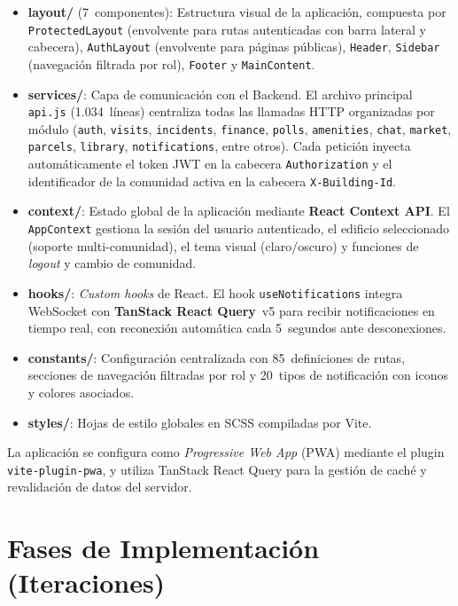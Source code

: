\begin{itemize}
    \item \textbf{layout/} (7~componentes): Estructura visual de la aplicación, compuesta por \texttt{ProtectedLayout} (envolvente para rutas autenticadas con barra lateral y cabecera), \texttt{AuthLayout} (envolvente para páginas públicas), \texttt{Header}, \texttt{Sidebar} (navegación filtrada por rol), \texttt{Footer} y \texttt{MainContent}.

    \item \textbf{services/}: Capa de comunicación con el Backend. El archivo principal \texttt{api.js} (1.034~líneas) centraliza todas las llamadas HTTP organizadas por módulo (\texttt{auth}, \texttt{visits}, \texttt{incidents}, \texttt{finance}, \texttt{polls}, \texttt{amenities}, \texttt{chat}, \texttt{market}, \texttt{parcels}, \texttt{library}, \texttt{notifications}, entre otros). Cada petición inyecta automáticamente el token JWT en la cabecera \texttt{Authorization} y el identificador de la comunidad activa en la cabecera \texttt{X-Building-Id}.

    \item \textbf{context/}: Estado global de la aplicación mediante \textbf{React Context API}. El \texttt{AppContext} gestiona la sesión del usuario autenticado, el edificio seleccionado (soporte multi-comunidad), el tema visual (claro/oscuro) y funciones de \textit{logout} y cambio de comunidad.

    \item \textbf{hooks/}: \textit{Custom hooks} de React. El hook \texttt{useNotifications} integra WebSocket con \textbf{TanStack React Query}~v5 para recibir notificaciones en tiempo real, con reconexión automática cada 5~segundos ante desconexiones.

    \item \textbf{constants/}: Configuración centralizada con 85~definiciones de rutas, secciones de navegación filtradas por rol y 20~tipos de notificación con iconos y colores asociados.

    \item \textbf{styles/}: Hojas de estilo globales en SCSS compiladas por Vite.
\end{itemize}

La aplicación se configura como \textit{Progressive Web App} (PWA) mediante el plugin \texttt{vite-plugin-pwa}, y utiliza TanStack React Query para la gestión de caché y revalidación de datos del servidor.


\section{Fases de Implementación (Iteraciones)}
\label{sec:fases_implementacion}

